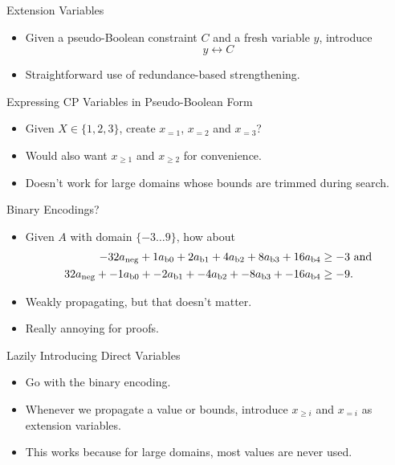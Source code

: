 \documentclass{beamer}
\begin{document}
\begin{frame}{Extension Variables}
    \begin{itemize}
        \item Given a pseudo-Boolean constraint $C$ and a fresh variable $y$, introduce \[ y
            \leftrightarrow C \]
        \item Straightforward use of redundance-based strengthening.
    \end{itemize}
\end{frame}

\begin{frame}{Expressing CP Variables in Pseudo-Boolean Form}
    \begin{itemize}
        \item Given $X \in \{ 1, 2, 3 \}$, create $x_{{=}1}$, $x_{{=}2}$ and $x_{{=}3}$?
        \item Would also want $x_{{\ge}1}$ and $x_{{\ge}2}$ for convenience.
        \item Doesn't work for large domains whose bounds are trimmed during search.
    \end{itemize}
\end{frame}

\begin{frame}{Binary Encodings?}
    \begin{itemize}
        \item Given $A$ with domain $\{ -3 \ldots 9 \}$, how about
\begin{align*}
    -32 a_{{\operatorname{neg}}} + 1 a_{{\operatorname{b}}0} + 2 a_{{\operatorname{b}}1} + 4
    a_{{\operatorname{b}}2} + 8 a_{{\operatorname{b}}3} + 16 a_{{\operatorname{b}}4} &\ge -3
    \textnormal{~and}\\
    32 a_{{\operatorname{neg}}} + -1 a_{{\operatorname{b}}0} + -2 a_{{\operatorname{b}}1} +
    -4 a_{{\operatorname{b}}2} + -8 a_{{\operatorname{b}}3} + -16 a_{{\operatorname{b}}4} &\ge -9
    \textnormal{.}
\end{align*}
        \item Weakly propagating, but that doesn't matter.
        \item Really annoying for proofs.
    \end{itemize}
\end{frame}

\begin{frame}{Lazily Introducing Direct Variables}
    \begin{itemize}
        \item Go with the binary encoding.
        \item Whenever we propagate a value or bounds, introduce $x_{{\ge}i}$ and $x_{{=}i}$
            as extension variables.
        \item This works because for large domains, most values are never used.
    \end{itemize}
\end{frame}
\end{document}
